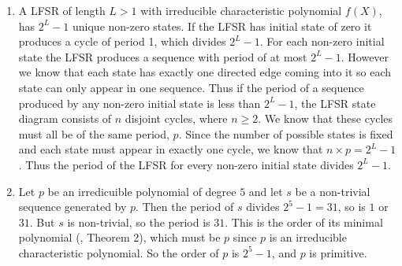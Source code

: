\begin{enumerate}

\item A LFSR of length $L > 1$ with irreducible characteristic polynomial $f(X)$,
has $2^{L}-1$ unique non-zero states. If the LFSR has initial state of zero it produces a
cycle of period 1, which divides $2^{L}-1$. For each non-zero initial state the LFSR produces a sequence with period of at most $2^{L}-1$. However we know that each state has exactly one directed edge coming into it so 
each state can only appear in one sequence. Thus if the period of a sequence produced
by any non-zero initial state is less than $2^{L}-1$, the LFSR state diagram 
consists of $n$ disjoint cycles, where $n \geq 2$. We know that these cycles 
must all be of the same period, $p$. Since the number of possible states is fixed 
and each state must appear in exactly one cycle, we know that $n \times p = 2^{L}-1$.
Thus the period of the LFSR for every non-zero initial state divides $2^{L}-1$.

\item Let $p$ be an irredicuible polynomial of degree $5$ and let $s$ be a non-trivial
sequence generated by $p$. Then the period of $s$ divides $2^5-1=31$, so is $1$ or $31$.
But $s$ is non-trivial, so the period is $31$. This is the order of its minimal polynomial
(\cite{slides}, Theorem 2), which must be $p$ since $p$ is an irreducible characteristic
polynomial. So the order of $p$ is $2^5-1$, and $p$ is primitive.

\end{enumerate}

